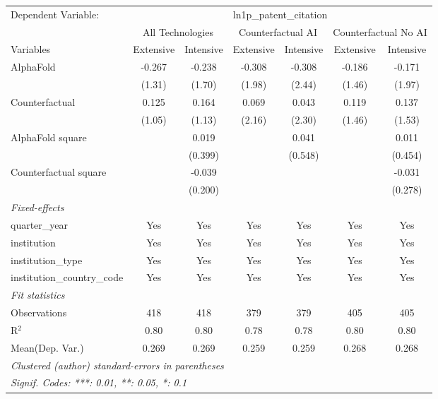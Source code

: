 \begingroup
\centering
\begin{tabular}{lcccccc}
   \tabularnewline \midrule \midrule
   Dependent Variable: & \multicolumn{6}{c}{ln1p\_patent\_citation}\\
 & \multicolumn{2}{c}{All Technologies} & \multicolumn{2}{c}{Counterfactual AI} & \multicolumn{2}{c}{Counterfactual No AI} \\
\cmidrule(lr){1-1}\cmidrule(lr){2-3} \cmidrule(lr){4-5} \cmidrule(lr){6-7}
Variables & \multicolumn{1}{c}{Extensive} & \multicolumn{1}{c}{Intensive} & \multicolumn{1}{c}{Extensive} & \multicolumn{1}{c}{Intensive} & \multicolumn{1}{c}{Extensive} & \multicolumn{1}{c}{Intensive} \\
\cmidrule(lr){1-1}\cmidrule(lr){2-2} \cmidrule(lr){3-3} \cmidrule(lr){4-4} \cmidrule(lr){5-5} \cmidrule(lr){6-6} \cmidrule(lr){7-7}
   AlphaFold                    & -0.267 & -0.238  & -0.308 & -0.308  & -0.186 & -0.171\\   
                                & (1.31) & (1.70)  & (1.98) & (2.44)  & (1.46) & (1.97)\\   
   Counterfactual               & 0.125  & 0.164   & 0.069  & 0.043   & 0.119  & 0.137\\   
                                & (1.05) & (1.13)  & (2.16) & (2.30)  & (1.46) & (1.53)\\   
   AlphaFold square             &        & 0.019   &        & 0.041   &        & 0.011\\   
                                &        & (0.399) &        & (0.548) &        & (0.454)\\   
   Counterfactual square        &        & -0.039  &        &         &        & -0.031\\   
                                &        & (0.200) &        &         &        & (0.278)\\   
   \midrule
   \emph{Fixed-effects}\\
   quarter\_year                & Yes    & Yes     & Yes    & Yes     & Yes    & Yes\\  
   institution                  & Yes    & Yes     & Yes    & Yes     & Yes    & Yes\\  
   institution\_type            & Yes    & Yes     & Yes    & Yes     & Yes    & Yes\\  
   institution\_country\_code   & Yes    & Yes     & Yes    & Yes     & Yes    & Yes\\  
   \midrule
   \emph{Fit statistics}\\
   Observations                 & 418    & 418     & 379    & 379     & 405    & 405\\  
   R$^2$                        & 0.80   & 0.80    & 0.78   & 0.78    & 0.80   & 0.80\\  
Mean(Dep. Var.) & 0.269 & 0.269 & 0.259 & 0.259 & 0.268 & 0.268 \\
   \midrule \midrule
   \multicolumn{7}{l}{\emph{Clustered (author) standard-errors in parentheses}}\\
   \multicolumn{7}{l}{\emph{Signif. Codes: ***: 0.01, **: 0.05, *: 0.1}}\\
\end{tabular}
\par\endgroup
